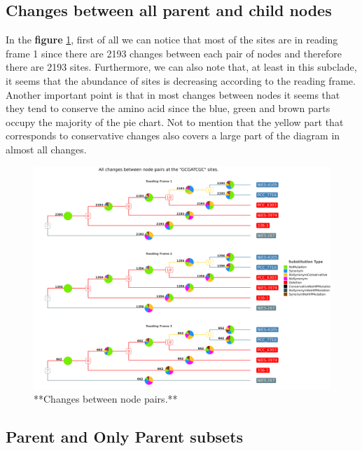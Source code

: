 \documentclass[
]{book}
\begin{document}
\hypertarget{changes-between-all-parent-and-child-nodes}{%
\subsection{Changes between all parent and child nodes}\label{changes-between-all-parent-and-child-nodes}}

In the \textbf{figure} \ref{fig:FIG10x}, first of all we can notice that most of the sites are in reading frame 1 since there are 2193 changes between each pair of nodes and therefore there are 2193 sites. Furthermore, we can also note that, at least in this subclade, it seems that the abundance of sites is decreasing according to the reading frame. Another important point is that in most changes between nodes it seems that they tend to conserve the amino acid since the blue, green and brown parts occupy the majority of the pie chart. Not to mention that the yellow part that corresponds to conservative changes also covers a large part of the diagram in almost all changes.

\begin{figure}
\includegraphics[width=1\linewidth]{figures/ALL_SITES_All_codon_mutations_tree} \caption{**Changes between node pairs.**}\label{fig:FIG10x}
\end{figure}

\hypertarget{parent-and-only-parent-subsets-1}{%
\subsection{Parent and Only Parent subsets}\label{parent-and-only-parent-subsets-1}}
\end{document}
